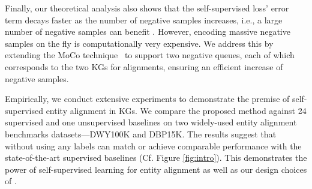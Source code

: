Finally, our theoretical analysis also shows that the self-supervised loss' error term decays faster as the number of negative samples increases, i.e., a large number of negative samples can benefit \solution. 
However, encoding massive negative samples on the fly is computationally very expensive. 
We address this by extending the MoCo technique~\cite{he2020momentum} to support two negative queues, each of which corresponds to the two KGs for alignments, ensuring an efficient increase of negative samples. 



Empirically, we conduct extensive experiments to demonstrate the premise of self-supervised entity alignment in KGs. 
We compare the proposed \solution method against 24 supervised and one unsupervised baselines on two widely-used entity alignment benchmarks datasets---DWY100K and DBP15K. 
The results suggest that \solution without using any labels can match or achieve comparable performance with the state-of-the-art supervised baselines (Cf.  Figure \ref{fig:intro}). 
This demonstrates the power of self-supervised learning for entity alignment as well as our design choices of \solution. 




























